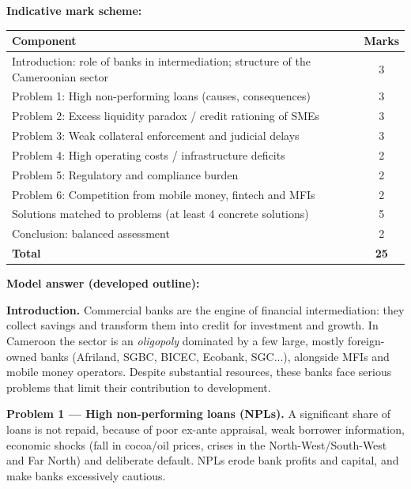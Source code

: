 \documentclass[11pt]{article}
\begin{document}
\begin{corrige}

\textbf{Indicative mark scheme:}

\begin{center}
\begin{tabularx}{\linewidth}{|X|c|}
\hline
\rowcolor{popblueL} \textbf{Component} & \textbf{Marks} \\
\hline
Introduction: role of banks in intermediation; structure of the Cameroonian sector & 3 \\
\hline
Problem 1: High non-performing loans (causes, consequences) & 3 \\
\hline
Problem 2: Excess liquidity paradox / credit rationing of SMEs & 3 \\
\hline
Problem 3: Weak collateral enforcement and judicial delays & 3 \\
\hline
Problem 4: High operating costs / infrastructure deficits & 2 \\
\hline
Problem 5: Regulatory and compliance burden & 2 \\
\hline
Problem 6: Competition from mobile money, fintech and MFIs & 2 \\
\hline
Solutions matched to problems (at least 4 concrete solutions) & 5 \\
\hline
Conclusion: balanced assessment & 2 \\
\hline
\rowcolor{popgreenL} \textbf{Total} & \textbf{25} \\
\hline
\end{tabularx}
\end{center}

\textbf{Model answer (developed outline):}

\textbf{Introduction.} Commercial banks are the engine of financial intermediation: they collect savings and transform them into credit for investment and growth. In Cameroon the sector is an \emph{oligopoly} dominated by a few large, mostly foreign-owned banks (Afriland, SGBC, BICEC, Ecobank, SGC...), alongside MFIs and mobile money operators. Despite substantial resources, these banks face serious problems that limit their contribution to development.

\textbf{Problem 1 — High non-performing loans (NPLs).} A significant share of loans is not repaid, because of poor ex-ante appraisal, weak borrower information, economic shocks (fall in cocoa/oil prices, crises in the North-West/South-West and Far North) and deliberate default. NPLs erode bank profits and capital, and make banks excessively cautious.


\end{corrige}
\end{document}
